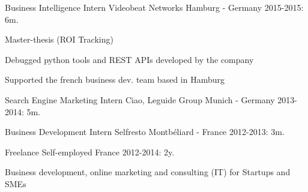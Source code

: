 \begin{cventries}
  \cventry
    {Business Intelligence Intern} %
    {Videobeat Networks} %
    {Hamburg - Germany} %
    {2015-2015: 6m.} %
    {
      \begin{cvitems} %
        \item {Master-thesis (ROI Tracking)}
        \item {Debugged python tools and REST APIs developed by the company}
        \item {Supported the french business dev. team based in Hamburg}
      \end{cvitems}
    }

  \cventry
    {Search Engine Marketing Intern} %
    {Ciao, Leguide Group} %
    {Munich - Germany} %
    {2013-2014: 5m.} %
    {
    }
    
	\cventry
	{Business Development Intern} %
	{Selfresto} %
	{Montbéliard - France} %
	{2012-2013: 3m.} %
	{
	}
	
  \cventry
    {Freelance} %
    {Self-employed} %
    {France} %
    {2012-2014: 2y.} %
    {	
      \begin{cvitems} %
      	\item{Business development, online marketing and consulting (IT) for Startups and SMEs}
      \end{cvitems}
    }

\end{cventries}
